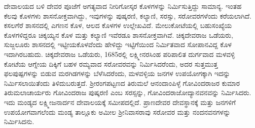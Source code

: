 ದೇವಾಲಯದ ಬಳಿ ದೇವರ ಪೂಜೆಗೆ ಅಗತ್ಯವಾದ ನೀರಿಗೋಸ್ಕರ ಕೊಳಗಳನ್ನು ನಿರ್ಮಿಸುತ್ತಿದ್ದು ಸಾಮಾನ್ಯ. ಇಂತಹ ಕೆಲವು ಕೊಳಗಳು ಶಾಸನೋಕ್ತವಾಗಿದ್ದು, ಇವುಗಳನ್ನು ಪುಷ್ಕರಣಿ, ಕಲ್ಯಾಣಿ, ಸರಸ್ಸು, ಸರೋವರಗಳೆಂದು ಕರೆಯಲಾಗಿದೆ. ಕಸಲಗೆರೆ ಶಾಸನದಲ್ಲಿ ಎಗಣನ ಕೊಳ, ಆಲದ ಕೊಳಗಳ ಉಲ್ಲೇಖವಿದೆ. ಮೇಲುಕೋಟೆಯಲ್ಲಿ ಬಹುಸಂಖ್ಯೆಯ ಕೊಳಗಳಿದ್ದರೂ ಚಿಕ್ಕಯ್ಯನ ಕೊಳ ಮತ್ತು ಕಲ್ಯಾಣಿ ಇವೆರಡೂ ಶಾಸನೋಕ್ತವಾಗಿವೆ. ಚಿಕ್ಕದೇವರಾಜ ಒಡೆಯರು, ಸುಜ್ಜಲೂರು ಶಾಸನದಲ್ಲಿ ಇಟ್ಟೀಯಕೊಳವೆಂದು ಹೇಳಿದ್ದು ಇಟ್ಟಿಗೆಯಿಂದ ನಿರ್ಮಿತವಾದ ಸೋಪಾನವಿದ್ದ ಕೊಳ ಇದಾಗಿರಬಹುದು. ಚಿಕ್ಕದೇವರಾಜ ಒಡೆಯರು, 1685ರಲ್ಲಿ ಲಕ್ಷ್ಮೀನರಸಿಂಹ ಪರಿಪಾಲಿತ ದುರ್ಗವಾದ ಮಳವಳ್ಳಿ ಕೋಟೆಯ ಆಗ್ನೇಯ ದಿಕ್ಕಿಗೆ ಬಹಳ ರಮ್ಯವಾದ ಸರೋವರವನ್ನು ನಿರ್ಮಿಸಿದರೆಂದು, ಅದರ ಸುತ್ತಮುತ್ತ ಫಲಪುಷ್ಪಗಳನ್ನು ಬಿಡುವ ಮರಗಿಡಗಳನ್ನು ಬೆಳೆಸಿದರೆಂದು, ಮಳವಳ್ಳಿಯ ಜನಗಳ ಉಪಯೋಗಕ್ಕಾಗಿ ಇದನ್ನು ನಿರ್ಮಿಸಲಾಯಿತೆಂದು ತಿಳಿದುಬರುತ್ತದೆ. ಶ‍್ರೀರಂಗಪಟ್ಟಣದ ತಿರುಮಲೆ ಆನಂದಾಂಪಿಳ್ಳೆ ಗೋವಿಂದರಾಜರ ಕುಮಾರ ತಿರುಮಲಾಚಾರ್ಯರು ಗೋವಿಂದರಾಜ ಪುಷ್ಕರಣಿ ಎಂಬ ಸರಸ್ಸನ್ನು, ಗೋವಿಂದರಾಜೋದ್ಯಾನವನವನ್ನು ನಿರ್ಮಿಸಿದರು. ಇದು ಮಂಡ್ಯದ ಲಕ್ಷ್ಮೀಜನಾರ್ದನ ದೇವಾಲಯಕ್ಕೆ ಸಮೀಪದಲ್ಲಿದೆ. ಪ್ರಾಣದೇವರ ದೇವಸ್ಥಾನಕ್ಕೆ ಮತ್ತು ಜನಗಳಿಗೆ ಉಪಯೋಗವಾಗಲೆಂದು ಮಂಡ್ಯ ತಾಲ್ಲೂಕು ಅಮೀಲ ಶ‍್ರೀನಿವಾಸರಾವು ಸರೋವರ ಮತ್ತು ನಂದನವನಗಳನ್ನು ನಿರ್ಮಿಸಿದನು.

